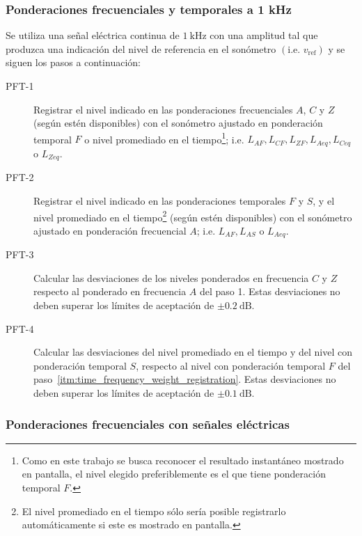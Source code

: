 \subsubsection{Ponderaciones frecuenciales y temporales a 1 kHz}
Se utiliza una señal eléctrica continua de $\qty{1}{\kHz}$ con una amplitud tal que produzca una indicación del nivel de referencia en el sonómetro $\left(\text{i.e. } v_{\mathrm{ref}}\right)$  y se siguen los pasos a continuación:
%
\begin{description}
    \item[PFT-1] Registrar el nivel indicado en las ponderaciones frecuenciales $A$, $C$ y $Z$ (según estén disponibles) con el sonómetro ajustado en ponderación temporal $F$ o nivel promediado en el tiempo\footnote{Como en este trabajo se busca reconocer el resultado instantáneo mostrado en pantalla, el nivel elegido preferiblemente es el que tiene ponderación temporal $F$.}; i.e. $L_{AF}, L_{CF}, L_{ZF}, L_{Aeq}, L_{Ceq}$ o $L_{Zeq}$.

    \item[PFT-2\label{itm:time_frequency_weight_registration}] Registrar el nivel indicado en las ponderaciones temporales $F$ y $S$, y el nivel promediado en el tiempo\footnote{El nivel promediado en el tiempo sólo sería posible registrarlo automáticamente si este es mostrado en pantalla.} (según estén disponibles) con el sonómetro ajustado en ponderación frecuencial $A$; i.e. $L_{AF}, L_{AS}$ o $L_{Aeq}$.

    \item[PFT-3] Calcular las desviaciones de los niveles ponderados en frecuencia $C$ y $Z$ respecto al ponderado en frecuencia $A$ del paso 1.
    Estas desviaciones no deben superar los límites de aceptación de $\pm\qty{0.2}{\dB}$.

    \item[PFT-4] Calcular las desviaciones del nivel promediado en el tiempo y del nivel con ponderación temporal $S$, respecto al nivel con ponderación temporal $F$ del paso~\ref{itm:time_frequency_weight_registration}.
    Estas desviaciones no deben superar los límites de aceptación de $\pm\qty{0.1}{\dB}$.
\end{description}

\subsubsection{Ponderaciones frecuenciales con señales eléctricas}

